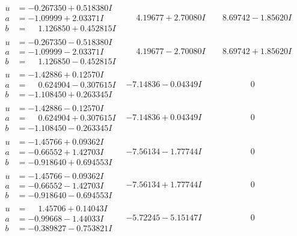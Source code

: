\documentclass[1p]{elsarticle_modified}
\theoremstyle{definition}
\begin{document}
$$\begin{array}{c|c|c}
\begin{aligned}
u &= -0.267350 + 0.518380 I \\
a &= -1.09999 + 2.03371 I \\
b &= \phantom{-}1.126850 + 0.452815 I\end{aligned}
 & \phantom{-}4.19677 + 2.70080 I & \phantom{-}8.69742 - 1.85620 I \\ \hline\begin{aligned}
u &= -0.267350 - 0.518380 I \\
a &= -1.09999 - 2.03371 I \\
b &= \phantom{-}1.126850 - 0.452815 I\end{aligned}
 & \phantom{-}4.19677 - 2.70080 I & \phantom{-}8.69742 + 1.85620 I \\ \hline\begin{aligned}
u &= -1.42886 + 0.12570 I \\
a &= \phantom{-}0.624904 - 0.307615 I \\
b &= -1.108450 + 0.263345 I\end{aligned}
 & -7.14836 - 0.04349 I & \phantom{-0.000000 } 0 \\ \hline\begin{aligned}
u &= -1.42886 - 0.12570 I \\
a &= \phantom{-}0.624904 + 0.307615 I \\
b &= -1.108450 - 0.263345 I\end{aligned}
 & -7.14836 + 0.04349 I & \phantom{-0.000000 } 0 \\ \hline\begin{aligned}
u &= -1.45766 + 0.09362 I \\
a &= -0.66552 + 1.42703 I \\
b &= -0.918640 + 0.694553 I\end{aligned}
 & -7.56134 - 1.77744 I & \phantom{-0.000000 } 0 \\ \hline\begin{aligned}
u &= -1.45766 - 0.09362 I \\
a &= -0.66552 - 1.42703 I \\
b &= -0.918640 - 0.694553 I\end{aligned}
 & -7.56134 + 1.77744 I & \phantom{-0.000000 } 0 \\ \hline\begin{aligned}
u &= \phantom{-}1.45706 + 0.14043 I \\
a &= -0.99668 - 1.44033 I \\
b &= -0.389827 - 0.753821 I\end{aligned}
 & -5.72245 - 5.15147 I & \phantom{-0.000000 } 0 \\ \hline\begin{aligned}

\end{aligned}
\end{array}$$
\end{document}
